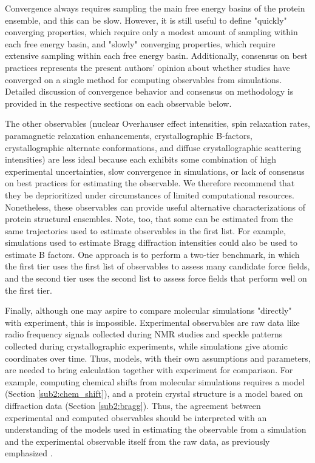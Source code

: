 \documentclass[9pt,review,pubversion]{livecoms}
\begin{document}
Convergence always requires sampling the main free energy basins of the protein ensemble, and this can be slow. However, it is still useful to define "quickly" converging properties, which require only a modest amount of sampling within each free energy basin, and "slowly" converging properties, which require extensive sampling within each free energy basin.
Additionally, consensus on best practices represents the present authors' opinion about whether studies have converged on a single method for computing observables from simulations.
Detailed discussion of convergence behavior and consensus on methodology is provided in the respective sections on each observable below.

The other observables (nuclear Overhauser effect intensities, spin relaxation rates, paramagnetic relaxation enhancements, crystallographic B-factors, crystallographic alternate conformations, and diffuse crystallographic scattering intensities) are less ideal because each exhibits some combination of high experimental uncertainties, slow convergence in simulations, or lack of consensus on best practices for estimating the observable.
We therefore recommend that they be deprioritized under circumstances of limited computational resources.
Nonetheless, these observables can provide useful alternative characterizations of protein structural ensembles.
Note, too, that some can be estimated from the same trajectories used to estimate observables in the first list.
For example, simulations used to estimate Bragg diffraction intensities could also be used to estimate B factors.
One approach is to perform a two-tier benchmark, in which the first tier uses the first list of observables to assess many candidate force fields, and the second tier uses the second list to assess force fields that perform well on the first tier.

Finally, although one may aspire to compare molecular simulations "directly" with experiment, this is impossible.
Experimental observables are raw data like radio frequency signals collected during NMR studies and speckle patterns collected during crystallographic experiments, while simulations give atomic coordinates over time.
Thus, models, with their own assumptions and parameters, are needed to bring calculation together with experiment for comparison.
For example, computing chemical shifts from molecular simulations requires a model (Section \ref{sub2:chem_shift}), and a protein crystal structure is a model based on diffraction data (Section \ref{sub2:bragg}).
Thus, the agreement between experimental and computed observables should be interpreted with an understanding of the models used in estimating the observable from a simulation and the experimental observable itself from the raw data, as previously emphasized \cite{van_gunsteren_deriving_2016,van_gunsteren_validation_2018}.
\end{document}
